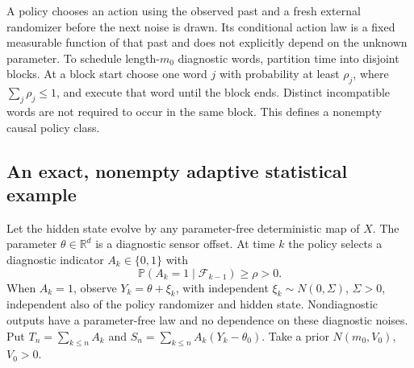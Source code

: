 A policy chooses an action using the observed past and a fresh external
randomizer before the next noise is drawn.  Its conditional action law is a
fixed measurable function of that past and does not explicitly depend on the
unknown parameter.  To schedule length-$m_0$ diagnostic words, partition time
into disjoint blocks.  At a block start choose one word $j$ with probability
at least $\rho_j$, where $\sum_j\rho_j\le1$, and execute that word until the
block ends.  Distinct incompatible words are not required to occur in the
same block.  This defines a nonempty causal policy class.

\subsection{An exact, nonempty adaptive statistical example}

Let the hidden state evolve by any parameter-free deterministic map of $X$.
The parameter $\theta\in\mathbb R^d$ is a diagnostic sensor offset.  At time
$k$ the policy selects a diagnostic indicator $A_k\in\{0,1\}$ with
\[
 \mathbb P(A_k=1\mid\mathcal F_{k-1})\ge\rho>0.
\]
When $A_k=1$, observe $Y_k=\theta+\xi_k$, with independent
$\xi_k\sim N(0,\Sigma)$, $\Sigma>0$, independent also of the policy
randomizer and hidden state.  Nondiagnostic outputs have a parameter-free
law and no dependence on these diagnostic noises.  Put
$T_n=\sum_{k\le n}A_k$ and
$S_n=\sum_{k\le n}A_k(Y_k-\theta_0)$.
Take a prior $N(m_0,V_0)$, $V_0>0$.

